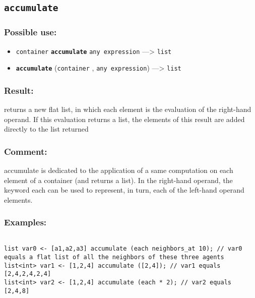 \documentclass[]{book}
\providecommand{\tightlist}{%
  \setlength{\itemsep}{0pt}\setlength{\parskip}{0pt}}
\theoremstyle{definition}
\theoremstyle{definition}
\theoremstyle{definition}
\theoremstyle{remark}
\begin{document}
\subsection{\texorpdfstring{\texttt{accumulate}}{accumulate}}\label{accumulate}

\subsubsection{Possible use:}\label{possible-use-17}

\begin{itemize}
\tightlist
\item
  \texttt{container} \textbf{\texttt{accumulate}}
  \texttt{any\ expression} ---\textgreater{} \texttt{list}
\item
  \textbf{\texttt{accumulate}} (\texttt{container} ,
  \texttt{any\ expression}) ---\textgreater{} \texttt{list}
\end{itemize}

\subsubsection{Result:}\label{result-16}

returns a new flat list, in which each element is the evaluation of the
right-hand operand. If this evaluation returns a list, the elements of
this result are added directly to the list returned

\subsubsection{Comment:}\label{comment-2}

accumulate is dedicated to the application of a same computation on each
element of a container (and returns a list). In the right-hand operand,
the keyword each can be used to represent, in turn, each of the
left-hand operand elements.

\subsubsection{Examples:}\label{examples-13}

\begin{verbatim}
 
list var0 <- [a1,a2,a3] accumulate (each neighbors_at 10); // var0 equals a flat list of all the neighbors of these three agents 
list<int> var1 <- [1,2,4] accumulate ([2,4]); // var1 equals [2,4,2,4,2,4] 
list<int> var2 <- [1,2,4] accumulate (each * 2); // var2 equals [2,4,8]
\end{verbatim}
\end{document}
